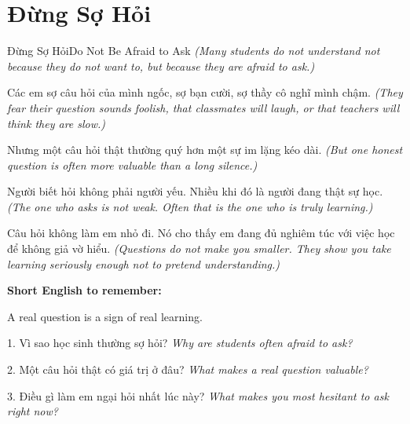 \section{Đừng Sợ Hỏi}
\begin{truyen}{Đừng Sợ Hỏi}{Do Not Be Afraid to Ask}
\textit{(Many students do not understand not because they do not want to, but because they are afraid to ask.)}

Các em sợ câu hỏi của mình ngốc, sợ bạn cười, sợ thầy cô nghĩ mình chậm.
\textit{(They fear their question sounds foolish, that classmates will laugh, or that teachers will think they are slow.)}

Nhưng một câu hỏi thật thường quý hơn một sự im lặng kéo dài.
\textit{(But one honest question is often more valuable than a long silence.)}

Người biết hỏi không phải người yếu. Nhiều khi đó là người đang thật sự học.
\textit{(The one who asks is not weak. Often that is the one who is truly learning.)}
\end{truyen}

\begin{baihoc}
Câu hỏi không làm em nhỏ đi. Nó cho thấy em đang đủ nghiêm túc với việc học để không giả vờ hiểu.
\textit{(Questions do not make you smaller. They show you take learning seriously enough not to pretend understanding.)}
\end{baihoc}

\begin{ghinhoanh}
\textbf{Short English to remember:}

A real question is a sign of real learning.

\end{ghinhoanh}

\begin{tuhocnhanh}
1. Vì sao học sinh thường sợ hỏi? \textit{Why are students often afraid to ask?}

2. Một câu hỏi thật có giá trị ở đâu? \textit{What makes a real question valuable?}

3. Điều gì làm em ngại hỏi nhất lúc này? \textit{What makes you most hesitant to ask right now?}
\end{tuhocnhanh}
\ngancach

